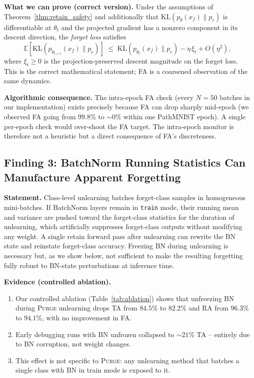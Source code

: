 \documentclass{article}
\newcommand{\ours}{\textsc{Purge}}
\newcommand{\E}{\mathbb{E}}
\newcommand{\KL}{\mathrm{KL}}
\begin{document}
{\textbf{What we can prove (correct version).} Under the assumptions of Theorem~\ref{thm:retain_safety} and additionally that $\KL(p_\theta(x_f)\|p_r)$ is differentiable at $\theta_t$ and the projected gradient has a nonzero component in its descent direction, the \emph{forget loss} satisfies
\[
\E\!\left[\KL(p_{\theta_{t+1}}(x_f)\|p_r)\right] \;\le\; \KL(p_{\theta_t}(x_f)\|p_r) - \eta\,\xi_t + O(\eta^2),
\]
where $\xi_t \ge 0$ is the projection-preserved descent magnitude on the forget loss. This is the correct mathematical statement; FA is a coarsened observation of the same dynamics.

\textbf{Algorithmic consequence.} The intra-epoch FA check (every $N = 50$ batches in our implementation) exists precisely because FA can drop sharply mid-epoch (we observed FA going from $99.8$\% to $\sim 0$\% within one PathMNIST epoch). A single per-epoch check would over-shoot the FA target. The intra-epoch monitor is therefore not a heuristic but a direct consequence of FA's discreteness.

\subsection{Finding 3: BatchNorm Running Statistics Can Manufacture Apparent Forgetting}
\label{find:bn}

\textbf{Statement.} Class-level unlearning batches forget-class samples in homogeneous mini-batches. If BatchNorm layers remain in \texttt{train} mode, their running mean and variance are pushed toward the forget-class statistics for the duration of unlearning, which artificially suppresses forget-class outputs without modifying any weight. A single retain forward pass after unlearning can rewrite the BN state and reinstate forget-class accuracy. Freezing BN during unlearning is necessary but, as we show below, not sufficient to make the resulting forgetting fully robust to BN-state perturbations at inference time.

\textbf{Evidence (controlled ablation).}
\begin{enumerate}[nosep,leftmargin=*]
\item Our controlled ablation (Table~\ref{tab:ablation}) shows that unfreezing BN during \ours{} unlearning drops TA from $84.5$\% to $82.2$\% and RA from $96.3$\% to $94.1$\%, with no improvement in FA.
\item Early debugging runs with BN unfrozen collapsed to $\sim 21$\% TA -- entirely due to BN corruption, not weight changes.
\item This effect is not specific to \ours{}: any unlearning method that batches a single class with BN in train mode is exposed to it.
\end{enumerate}

}
\end{document}
